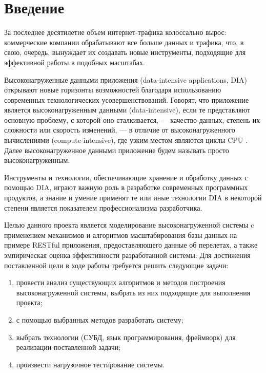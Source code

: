 \chapter*{Введение}




За последнее десятилетие объем интернет-трафика колоссально вырос: коммерческие компании обрабатывают все больше данных и трафика, что, в свою, очередь, вынуждает их создавать новые инструменты, подходящие для эффективной работы в подобных масштабах.

Высоконагруженные данными приложения (data-intensive applications, DIA) открывают новые горизонты возможностей благодаря использованию современных технологических усовершенствований. Говорят, что приложение является высоконагруженным данными (data-intensive), если те представляют основную проблему, с которой оно сталкивается, — качество данных, степень их сложности или скорость изменений, — в отличие от высоконагруженного вычислениями (compute-intensive), где узким местом являются циклы CPU \cite{oreilly}. Далее высоконагруженное данными приложение будем называть просто высоконагруженным.

Инструменты и технологии, обеспечивающие хранение и обработку данных с помощью DIA, играют важную роль в разработке современных программных продуктов, а знание и умение применят те или иные технологии DIA в некоторой степени является показателем профессионализма разработчика.

Целью данного проекта является моделирование высоконагруженной системы c применением механизмов и алгоритмов масштабирования базы данных на примере RESTful \cite{rest-api} приложения, предоставляющего данные об перелетах, а также эмпирическая оценка эффективности разработанной системы.
Для достижения поставленной цели в ходе работы требуется решить следующие задачи:

\begin{enumerate}
	\item провести анализ существующих алгоритмов и методов построения высоконагруженной системы, выбрать из них подходящие для выполнения проекта;
	\item с помощью выбранных методов разработать систему;
	\item выбрать технологии (СУБД, язык программирования, фреймворк) для реализации поставленной задачи;
	\item произвести нагрузочное тестирование системы.
\end{enumerate}